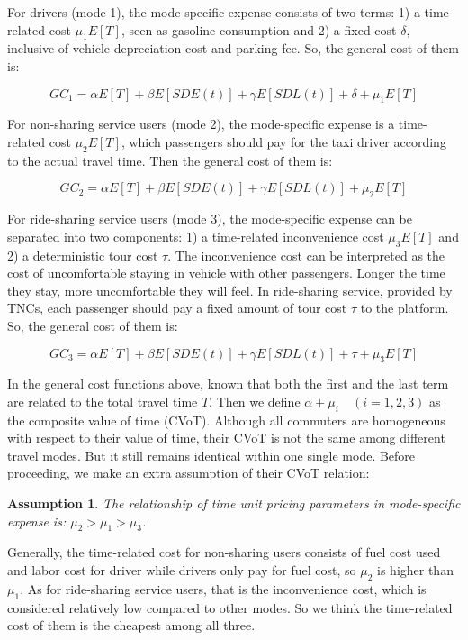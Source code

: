 \documentclass[a4paper,11pt]{article}
\newtheorem{assumption}{Assumption}
\begin{document}
For drivers (mode 1), the mode-specific expense consists of two terms: 1) a time-related cost $\mu_1E[T]$, seen as gasoline consumption and 2) a fixed cost $\delta$, inclusive of vehicle depreciation cost and parking fee. So, the general cost of them is:

\begin{equation}
    GC_1=\alpha E[T]+\beta E[SDE(t)]+\gamma E[SDL(t)]+ \delta +\mu_1 E[T]
\end{equation}

For non-sharing service users (mode 2), the mode-specific expense is a time-related cost $\mu_2E[T]$, which passengers should pay for the taxi driver according to the actual travel time. Then the general cost of them is:

\begin{equation}
    GC_2=\alpha E[T]+\beta E[SDE(t)]+\gamma E[SDL(t)] +\mu_2 E[T]
\end{equation}

For ride-sharing service users (mode 3), the mode-specific expense can be separated into two components: 1) a time-related inconvenience cost $\mu_3 E[T]$ and 2) a deterministic tour cost $\tau$. The inconvenience cost can be interpreted as the cost of uncomfortable staying in vehicle with other passengers. Longer the time they stay, more uncomfortable they will feel. 
In ride-sharing service, provided by TNCs, each passenger should pay a fixed amount of tour cost $\tau$ to the platform. So, the general cost of them is:

\begin{equation}
    GC_3=\alpha E[T]+\beta E[SDE(t)]+\gamma E[SDL(t)]+\tau +\mu_3 E[T]
\end{equation}

In the general cost functions above, known that both the first and the last term are related to the total travel time $T$. Then we define $\alpha+\mu_i \quad (i=1,2,3)$ as the composite value of time (CVoT). Although all commuters are homogeneous with respect to their value of time, their CVoT is not the same among different travel modes. But it still remains identical within one single mode. Before proceeding, we make an extra assumption of their CVoT relation:

\begin{assumption} \label{ass:mu relation}
The relationship of time unit pricing parameters in mode-specific expense is: $\mu_2>\mu_1>\mu_3$.
\end{assumption}

Generally, the time-related cost for non-sharing users consists of fuel cost used and labor cost for driver while drivers only pay for fuel cost, so $\mu_2$ is higher than $\mu_1$. As for ride-sharing service users, that is the inconvenience cost, which is considered relatively low compared to other modes. So we think the time-related cost of them is the cheapest among all three. 
\end{document}
